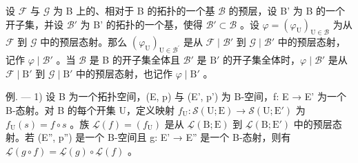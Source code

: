 设 \(\mathcal{F}\) 与 \(\mathcal{G}\) 为 B 上的、相对于 B 的拓扑的一个基 \(\mathcal{B}\) 的预层，设 B' 为 B 的一个开子集，并设 \(\mathcal{B}'\) 为 B' 的拓扑的一个基，使得 \(\mathcal{B}' \subset \mathcal{B}\) 。设 \(\varphi = (\varphi_{\mathrm{U}})_{\mathrm{U} \in \mathcal{B}}\) 为从 \(\mathcal{F}\) 到 \(\mathcal{G}\) 中的预层态射。那么 \((\varphi_{\mathrm{U}})_{\mathrm{U}\in \mathcal{B}^{\prime}}\) 是从 \(\mathcal{F}\mid \mathcal{B}'\) 到 \(\mathcal{G}\mid \mathcal{B}'\) 中的预层态射，记作 \(\varphi \mid \mathcal{B}'\) 。当 \(\mathcal{B}\) 是 B 的开子集全体且 \(\mathcal{B}'\) 是 \(\mathrm{B}'\) 的开子集全体时，\(\varphi \mid \mathcal{B}'\) 是从 \(\mathcal{F}\mid \mathrm{B}'\) 到 \(\mathcal{G}\mid \mathrm{B}'\) 中的预层态射，也记作 \(\varphi \mid \mathrm{B}'\) 。

例. --- 1) 设 B 为一个拓扑空间，(E, p) 与 (E', p') 为 B-空间，f: E → E' 为一个 B-态射。对 B 的每个开集 U，定义映射 \(f_{\mathrm{U}} \colon \mathcal{S}(\mathrm{U}; \mathrm{E}) \to \mathcal{S}(\mathrm{U}; \mathrm{E}')\) 为 \(f_{\mathrm{U}}(s) = f \circ s\) 。族 \(\underline{\mathcal{L}}(f) = (f_{\mathrm{U}})\) 是从 \(\underline{\mathcal{L}}(\mathrm{B}; \mathrm{E})\) 到 \(\underline{\mathcal{L}}(\mathrm{B}; \mathrm{E}')\) 中的预层态射。若 (E'', p'') 是一个 B-空间且 g: E' → E'' 是一个 B-态射，则有 \(\underline{\mathcal{L}}(g \circ f) = \underline{\mathcal{L}}(g) \circ \underline{\mathcal{L}}(f)\) 。

